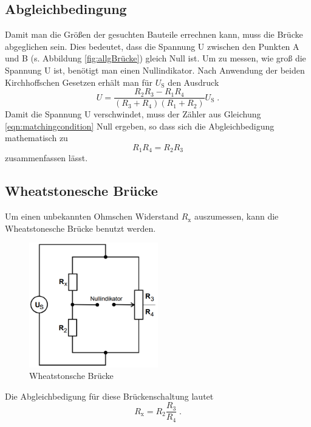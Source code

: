 \subsection{Abgleichbedingung}
Damit man die Größen der gesuchten Bauteile errechnen kann, muss die Brücke abgeglichen sein. Dies bedeutet, dass die Spannung U zwischen den Punkten A und B (s. 
Abbildung \ref{fig:allgBrücke}) gleich Null ist. Um zu messen, wie groß die Spannung U ist, benötigt man einen Nullindikator.
Nach Anwendung der beiden Kirchhoffschen Gesetzen erhält man für $U_\text{S}$ den Ausdruck  
\begin{equation}
    U = \frac{R_2 R_3 - R_1 R_4}{\left( R_3 + R_4 \right) \left( R_1 + R_2\right)} U_\text{S} \; \text{.} \label{eqn:U}
\end{equation}
Damit die Spannung U verschwindet, muss der Zähler aus Gleichung \eqref{eqn:matchingcondition} Null ergeben, so dass sich die Abgleichbedigung mathematisch zu
\begin{equation}
    R_1 R_4 = R_2 R_3 \label{fig:matchingcondition}
\end{equation}
zusammenfassen lässt. 
\subsection{Wheatstonesche Brücke}
Um einen unbekannten Ohmschen Widerstand $R_\text{x}$ auszumessen, kann die Wheatstonesche Brücke benutzt werden. 
\begin{figure}
    \centering
    \caption{Wheatstonsche Brücke}
    \label{fig:Wheatstone}
    \includegraphics[width = 0.5\textwidth]{bridges/wheat.png}
\end{figure}
Die Abgleichbedigung für diese Brückenschaltung lautet
\begin{equation}
    R_\text{x} = R_2 \frac{R_3}{R_4} \; \text{.}
\end{equation}
